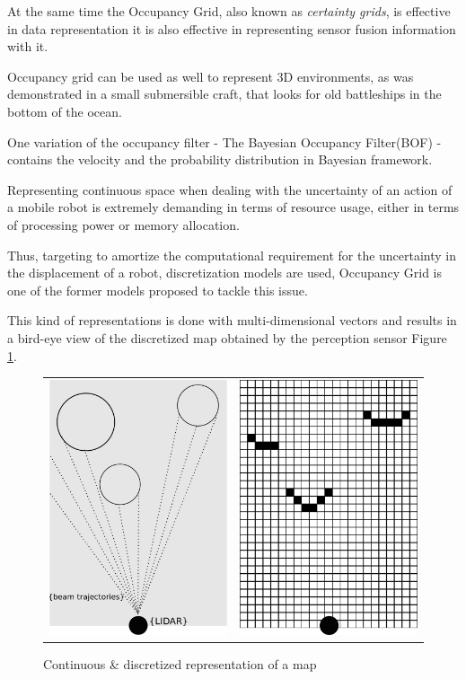 At the same time the Occupancy Grid, also known as \textit{certainty grids}, is effective in data representation it is also effective in representing sensor fusion information with it. 

Occupancy grid can be used as well to represent 3D environments, as was demonstrated in a small submersible craft, that looks for old battleships in the bottom of the ocean\cite{DBLP:journals/aim/Moravec88}.

One variation of the occupancy filter - The Bayesian Occupancy Filter(BOF) \cite{coue:inria-00182004} - contains the velocity and the probability distribution in Bayesian framework.

Representing continuous space when dealing with the uncertainty of an action of a mobile robot is extremely demanding in terms of resource usage, either in terms of processing power or memory allocation.

Thus, targeting to amortize the computational requirement for the uncertainty in the displacement of a robot, discretization models are used, Occupancy Grid\cite{Elfes:1989:UOG:68491.68495} is one of the former models proposed to tackle this issue.

This kind of representations is done with multi-dimensional vectors and results in a bird-eye view of the discretized map obtained by the perception sensor Figure \ref{fig:grid:continuous:discretized}.

\begin{figure}[h]
\centering
	\begin{tabular}{lr}\\
		\includegraphics[width=0.25\columnwidth]{img/fig:motion:impactpoint:01} & %
		\includegraphics[width=0.25\columnwidth]{img/fig:motion:impactpoint:02} %
	\end{tabular}
	\caption{Continuous \& discretized representation of a map}
	\label{fig:grid:continuous:discretized}
\end{figure}

